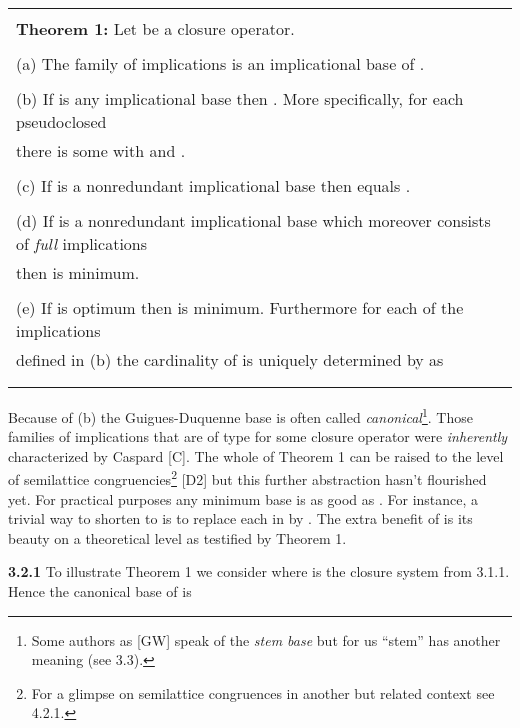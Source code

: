 \documentclass[11pt]{article}
\begin{document}
\begin{tabular}{|l|} \hline \\
{\bf Theorem 1:} Let  be a closure operator.\\
\\
(a) The family of implications  is an implicational base of .\\
\\
(b) If  is any implicational base then . More specifically, for each pseudoclosed\\
\hspace*{.5cm}  there is some  with  and .\\
\\
(c) If  is a nonredundant implicational base then  equals .\\
\\
(d) If  is a nonredundant implicational base which moreover consists of {\it full} implications\\
\hspace*{.5cm}  then  is minimum.\\
\\
(e) If  is optimum then  is minimum. Furthermore for each of the implications \\
\hspace*{.5cm} defined in (b) the cardinality of  is uniquely determined by  as\\
\hspace*{.5cm} \\ \\ \hline 
\end{tabular}

Because of (b) the Guigues-Duquenne base is often called {\it canonical}\footnote{Some authors as [GW] speak of the {\it stem base} but for us ``stem'' has another meaning (see 3.3).}. 
Those families  of implications that are of type  for some closure operator  were {\it inherently} characterized by Caspard [C]. The whole of Theorem 1 can be raised to the level of semilattice congruencies\footnote{For a glimpse on semilattice congruences in another but related context see 4.2.1.} [D2] but this further abstraction hasn't flourished yet. For practical purposes any minimum base  is as good as .  For instance, a trivial way to shorten  to  is to replace each  in  by . The extra benefit of  is its beauty on a theoretical level as testified by Theorem 1. 



{\bf 3.2.1} To illustrate Theorem 1 we consider  where  is the closure system from 3.1.1. Hence the canonical base of  is
\end{document}
